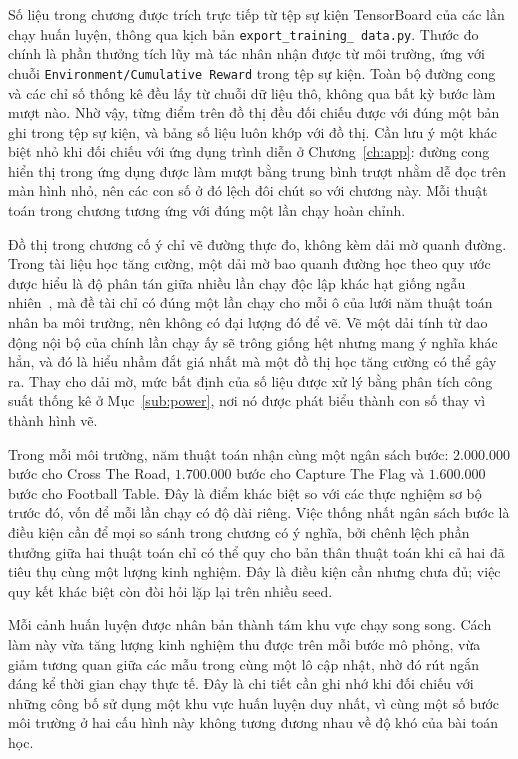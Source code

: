 \indent Số liệu trong chương được trích trực tiếp từ tệp sự kiện TensorBoard của các lần
chạy huấn luyện, thông qua kịch bản \texttt{export\_\allowbreak training\_\allowbreak
data.py}. Thước đo chính là phần thưởng tích lũy mà tác nhân nhận được từ môi trường, ứng
với chuỗi \texttt{Environment/\allowbreak Cumulative Reward} trong tệp sự kiện. Toàn bộ
đường cong và các chỉ số thống kê đều lấy từ chuỗi dữ liệu thô, không qua bất kỳ bước làm
mượt nào. Nhờ vậy, từng điểm trên đồ thị đều đối chiếu được với đúng một bản ghi trong tệp
sự kiện, và bảng số liệu luôn khớp với đồ thị. Cần lưu ý một khác biệt nhỏ khi đối chiếu
với ứng dụng trình diễn ở Chương~\ref{ch:app}: đường cong hiển thị trong ứng dụng được làm
mượt bằng trung bình trượt nhằm dễ đọc trên màn hình nhỏ, nên các con số ở đó lệch đôi
chút so với chương này. Mỗi thuật toán trong chương tương ứng với đúng một lần chạy hoàn
chỉnh.

\indent Đồ thị trong chương cố ý chỉ vẽ đường thực đo, không kèm dải mờ quanh đường. Trong
tài liệu học tăng cường, một dải mờ bao quanh đường học theo quy ước được hiểu là độ phân
tán giữa nhiều lần chạy độc lập khác hạt giống ngẫu nhiên~\cite{henderson2018matters,
agarwal2021precipice}, mà đề tài chỉ có đúng một lần chạy cho mỗi ô của lưới năm thuật toán
nhân ba môi trường, nên không có đại lượng đó để vẽ. Vẽ một dải tính từ dao động nội bộ của
chính lần chạy ấy sẽ trông giống hệt nhưng mang ý nghĩa khác hẳn, và đó là hiểu nhầm đắt giá
nhất mà một đồ thị học tăng cường có thể gây ra. Thay cho dải mờ, mức bất định của số liệu
được xử lý bằng phân tích công suất thống kê ở Mục~\ref{sub:power}, nơi nó được phát biểu
thành con số thay vì thành hình vẽ.

\indent Trong mỗi môi trường, năm thuật toán nhận cùng một ngân sách bước: $2.000.000$
bước cho Cross The Road, $1.700.000$ bước cho Capture The Flag và $1.600.000$ bước cho
Football Table. Đây là điểm khác biệt so với các thực nghiệm sơ bộ trước đó, vốn để mỗi
lần chạy có độ dài riêng. Việc thống nhất ngân sách bước là điều kiện cần để mọi so sánh
trong chương có ý nghĩa, bởi chênh lệch phần thưởng giữa hai thuật toán chỉ có thể quy cho
bản thân thuật toán khi cả hai đã tiêu thụ cùng một lượng kinh nghiệm. Đây là điều kiện
cần nhưng chưa đủ; việc quy kết khác biệt còn đòi hỏi lặp lại trên nhiều seed.

\indent Mỗi cảnh huấn luyện được nhân bản thành tám khu vực chạy song song. Cách làm này
vừa tăng lượng kinh nghiệm thu được trên mỗi bước mô phỏng, vừa giảm tương quan giữa các
mẫu trong cùng một lô cập nhật, nhờ đó rút ngắn đáng kể thời gian chạy thực tế. Đây là chi
tiết cần ghi nhớ khi đối chiếu với những công bố sử dụng một khu vực huấn luyện duy nhất,
vì cùng một số bước môi trường ở hai cấu hình này không tương đương nhau về độ khó của bài
toán học.

